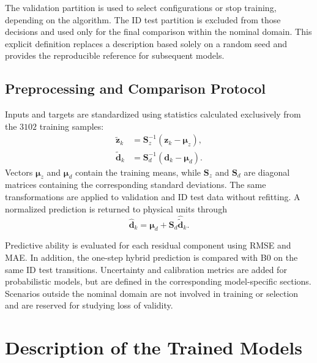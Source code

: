 \documentclass[12pt,a4paper]{report}
\begin{document}
The validation partition is used to select configurations or stop training, depending on the algorithm. The ID test partition is excluded from those decisions and used only for the final comparison within the nominal domain. This explicit definition replaces a description based solely on a random seed and provides the reproducible reference for subsequent models.

\subsection{Preprocessing and Comparison Protocol}

Inputs and targets are standardized using statistics calculated exclusively from the $3102$ training samples:
\begin{align}
    \tilde{\mathbf{z}}_k
    &=
    \mathbf{S}_z^{-1}
    \left(\mathbf{z}_k-\boldsymbol{\mu}_z\right),
    \label{eq:b1_input_normalization}\\
    \tilde{\mathbf{d}}_k
    &=
    \mathbf{S}_d^{-1}
    \left(\mathbf{d}_k-\boldsymbol{\mu}_d\right).
    \label{eq:b1_target_normalization}
\end{align}
Vectors $\boldsymbol{\mu}_z$ and $\boldsymbol{\mu}_d$ contain the training means, while $\mathbf{S}_z$ and $\mathbf{S}_d$ are diagonal matrices containing the corresponding standard deviations. The same transformations are applied to validation and ID test data without refitting. A normalized prediction is returned to physical units through
\begin{equation}
    \hat{\mathbf{d}}_k
    =
    \boldsymbol{\mu}_d
    +
    \mathbf{S}_d\hat{\tilde{\mathbf{d}}}_k.
    \label{eq:b1_denormalization}
\end{equation}

Predictive ability is evaluated for each residual component using RMSE and MAE. In addition, the one-step hybrid prediction is compared with B0 on the same ID test transitions. Uncertainty and calibration metrics are added for probabilistic models, but are defined in the corresponding model-specific sections. Scenarios outside the nominal domain are not involved in training or selection and are reserved for studying loss of validity.

\section{Description of the Trained Models}
\label{sec:descripcion_modelos_entrenados}
\end{document}
